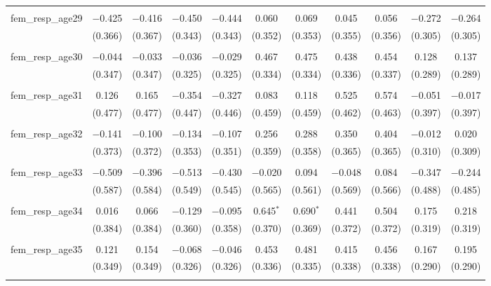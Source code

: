 \begin{table}[!htbp]
\begin{tabular}{@{\extracolsep{5pt}}lcccccccccc}
  & & & & & & & & & & \\ 
 fem\_resp\_age29 & $-$0.425 & $-$0.416 & $-$0.450 & $-$0.444 & 0.060 & 0.069 & 0.045 & 0.056 & $-$0.272 & $-$0.264 \\ 
  & (0.366) & (0.367) & (0.343) & (0.343) & (0.352) & (0.353) & (0.355) & (0.356) & (0.305) & (0.305) \\ 
  & & & & & & & & & & \\ 
 fem\_resp\_age30 & $-$0.044 & $-$0.033 & $-$0.036 & $-$0.029 & 0.467 & 0.475 & 0.438 & 0.454 & 0.128 & 0.137 \\ 
  & (0.347) & (0.347) & (0.325) & (0.325) & (0.334) & (0.334) & (0.336) & (0.337) & (0.289) & (0.289) \\ 
  & & & & & & & & & & \\ 
 fem\_resp\_age31 & 0.126 & 0.165 & $-$0.354 & $-$0.327 & 0.083 & 0.118 & 0.525 & 0.574 & $-$0.051 & $-$0.017 \\ 
  & (0.477) & (0.477) & (0.447) & (0.446) & (0.459) & (0.459) & (0.462) & (0.463) & (0.397) & (0.397) \\ 
  & & & & & & & & & & \\ 
 fem\_resp\_age32 & $-$0.141 & $-$0.100 & $-$0.134 & $-$0.107 & 0.256 & 0.288 & 0.350 & 0.404 & $-$0.012 & 0.020 \\ 
  & (0.373) & (0.372) & (0.353) & (0.351) & (0.359) & (0.358) & (0.365) & (0.365) & (0.310) & (0.309) \\ 
  & & & & & & & & & & \\ 
 fem\_resp\_age33 & $-$0.509 & $-$0.396 & $-$0.513 & $-$0.430 & $-$0.020 & 0.094 & $-$0.048 & 0.084 & $-$0.347 & $-$0.244 \\ 
  & (0.587) & (0.584) & (0.549) & (0.545) & (0.565) & (0.561) & (0.569) & (0.566) & (0.488) & (0.485) \\ 
  & & & & & & & & & & \\ 
 fem\_resp\_age34 & 0.016 & 0.066 & $-$0.129 & $-$0.095 & 0.645$^{*}$ & 0.690$^{*}$ & 0.441 & 0.504 & 0.175 & 0.218 \\ 
  & (0.384) & (0.384) & (0.360) & (0.358) & (0.370) & (0.369) & (0.372) & (0.372) & (0.319) & (0.319) \\ 
  & & & & & & & & & & \\ 
 fem\_resp\_age35 & 0.121 & 0.154 & $-$0.068 & $-$0.046 & 0.453 & 0.481 & 0.415 & 0.456 & 0.167 & 0.195 \\ 
  & (0.349) & (0.349) & (0.326) & (0.326) & (0.336) & (0.335) & (0.338) & (0.338) & (0.290) & (0.290) \\ 
  & & & & & & & & & & \\ 

\end{tabular}
\end{table}

